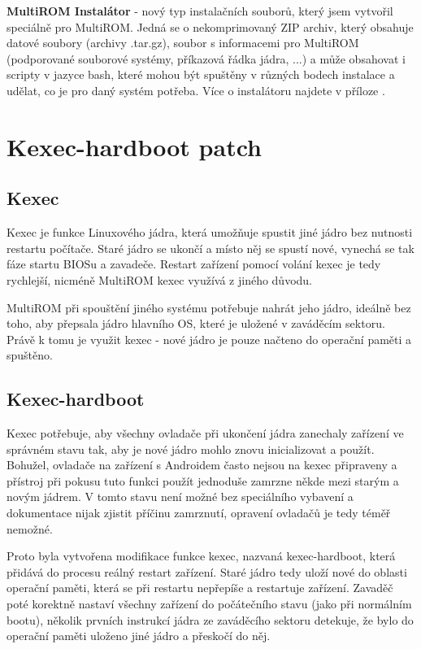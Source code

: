 \documentclass[12pt, a4paper, oneside]{article}
\newcommand{\B}{\textbf} %
\begin{document}
\B{MultiROM Instalátor} - nový typ instalačních souborů, který jsem vytvořil speciálně pro MultiROM. Jedná se o nekomprimovaný ZIP archiv, který obsahuje datové soubory (archivy .tar.gz), soubor s informacemi pro MultiROM (podporované souborové systémy, příkazová řádka jádra, ...) a může obsahovat i scripty v jazyce bash, které mohou být spuštěny v různých bodech instalace a udělat, co je pro daný systém potřeba. Více o instalátoru najdete v příloze .

\section {Kexec-hardboot patch}
\subsection{Kexec}
Kexec je funkce Linuxového jádra, která umožňuje spustit jiné jádro bez nutnosti restartu počítače. Staré jádro se ukončí a místo něj se spustí nové, vynechá se tak fáze startu BIOSu a zavadeče. Restart zařízení pomocí volání kexec je tedy rychlejší, nicméně MultiROM kexec využívá z jiného důvodu.

MultiROM při spouštění jiného systému potřebuje nahrát jeho jádro, ideálně bez toho, aby přepsala jádro hlavního OS, které je uložené v zaváděcím sektoru. Právě k tomu je využit kexec - nové jádro je pouze načteno do operační paměti a spuštěno.

\subsection{Kexec-hardboot}
Kexec potřebuje, aby všechny ovladače při ukončení jádra zanechaly zařízení ve správném stavu tak, aby je nové jádro mohlo znovu inicializovat a použít. Bohužel, ovladače na zařízení s Androidem často nejsou na kexec připraveny a přístroj při pokusu tuto funkci použít jednoduše zamrzne někde mezi starým a novým jádrem. V tomto stavu není možné bez speciálního vybavení a dokumentace nijak zjistit příčinu zamrznutí, opravení ovladačů je tedy téměř nemožné.

Proto byla vytvořena modifikace funkce kexec, nazvaná kexec-hardboot, která přidává do procesu reálný restart zařízení. Staré jádro tedy uloží nové do oblasti operační paměti, která se při restartu nepřepíše a restartuje zařízení. Zavaděč poté korektně nastaví všechny zařízení do počátečního stavu (jako při normálním bootu), několik prvních instrukcí jádra ze zaváděcího sektoru detekuje, že bylo do operační paměti uloženo jiné jádro a přeskočí do něj.
\end{document}
